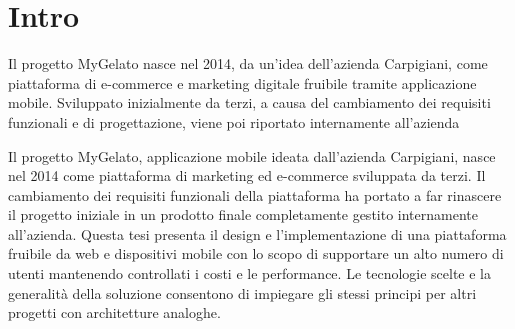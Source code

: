 
\section*{Intro}

Il progetto MyGelato nasce nel 2014, da un'idea dell'azienda Carpigiani,
come piattaforma di e-commerce e marketing digitale fruibile tramite
applicazione mobile. Sviluppato inizialmente da terzi, a causa del
cambiamento dei requisiti funzionali e di progettazione, viene poi
riportato internamente all'azienda

Il progetto MyGelato, applicazione mobile ideata dall’azienda Carpigiani,
nasce nel 2014 come piattaforma di marketing ed e-commerce sviluppata
da terzi. Il cambiamento dei requisiti funzionali della piattaforma
ha portato a far rinascere il progetto iniziale in un prodotto finale
completamente gestito internamente all’azienda. Questa tesi presenta
il design e l’implementazione di una piattaforma fruibile da web e
dispositivi mobile con lo scopo di supportare un alto numero di utenti
mantenendo controllati i costi e le performance. Le tecnologie scelte
e la generalità della soluzione consentono di impiegare gli stessi
principi per altri progetti con architetture analoghe. \newpage{}
